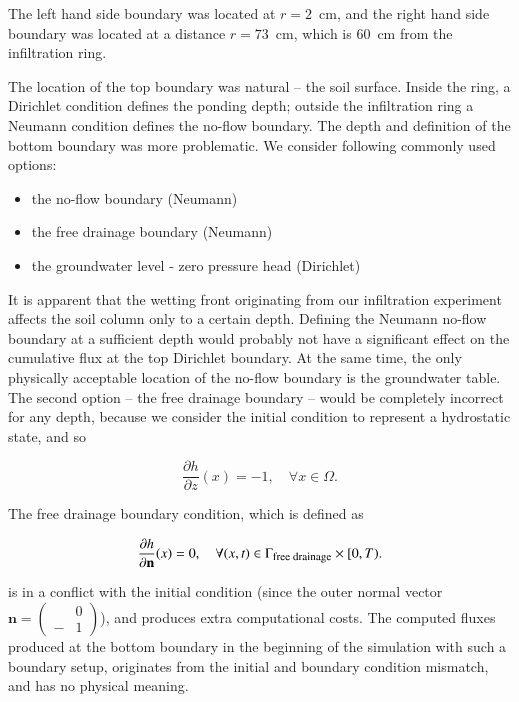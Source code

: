 \documentclass[review,times,3p,10pt]{elsarticle}
\newenvironment{lineq}
    {\begin{linenomath*}
    \begin{equation}
    }
    { 
    \end{equation} 
    \end{linenomath*}
    }
\renewcommand{\vec}{\mathbf}
\newcommand{\mich}[1]{{\color{magenta}{#1}}}
\begin{document}
The left hand side boundary was located at $r=2$~cm, and the right hand side boundary was located at a distance $r=73$~cm, which is 60~cm from the infiltration ring. \mich{The reasons for such position of the left hand side boundary will be explained in the section below.}

 The location of the top boundary was natural -- the soil surface. Inside the ring, a Dirichlet condition defines the ponding depth; outside the infiltration ring a Neumann condition defines the no-flow boundary. The depth and definition of the bottom boundary was more problematic. We consider following commonly used options:
\begin{itemize}
\item the no-flow boundary (Neumann)
\item the free drainage boundary (Neumann)
\item the groundwater level - zero pressure head (Dirichlet)
\end{itemize}
It is apparent that the wetting front originating from our infiltration experiment affects the soil column only to a certain depth. Defining the Neumann no-flow boundary at a sufficient depth would probably not have a significant effect on the cumulative flux at the top Dirichlet boundary. At the same time, the only physically acceptable location of the no-flow boundary is the groundwater table. The second option -- the free drainage boundary -- would be completely incorrect for any depth, because we consider the initial condition to represent a hydrostatic state, and so \begin{lineq} \frac{\partial h}{\partial z}(x) = -1, \quad \forall x \in \Omega .\end{lineq} The free drainage boundary condition, which is defined as
\begin{lineq}
\frac{\partial h}{\partial \vec{n}}(x) = 0, \quad \forall (x,t) \in \Gamma_{\mbox{\footnotesize free drainage}} \times [0,T).
\end{lineq}
is in a conflict with the initial condition (since the outer normal vector $\vec{n} = \left(\begin{smallmatrix} &0 \\ -&1 \end{smallmatrix} \right)$), and produces extra computational costs. The computed fluxes produced at the bottom boundary in the beginning of the simulation with such a boundary setup, originates from the initial and boundary condition mismatch, and has no physical meaning.
\end{document}
